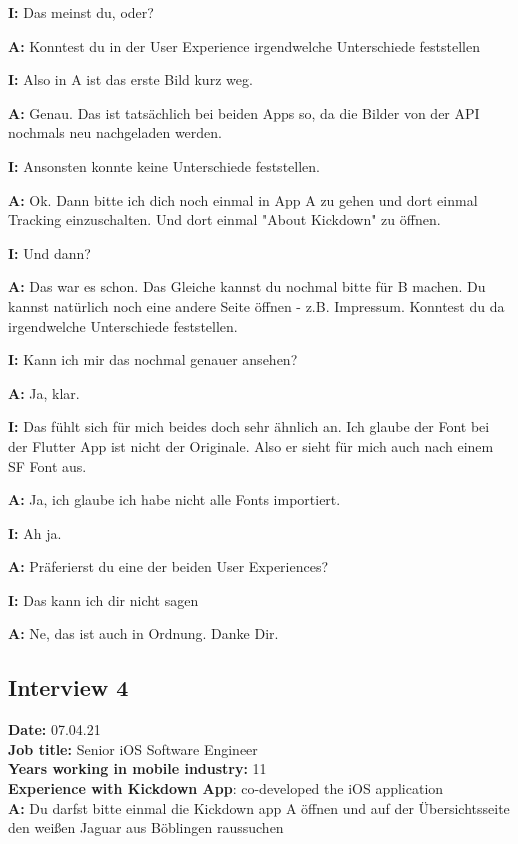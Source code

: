 \begin{myparindent}{0pt}
\textbf{I:} Das meinst du, oder?

\textbf{A:} Konntest du in der User Experience irgendwelche Unterschiede feststellen

\textbf{I:} Also in A ist das erste Bild kurz weg. 

\textbf{A:} Genau. Das ist tatsächlich bei beiden Apps so, da die Bilder von der API nochmals neu nachgeladen werden.

\textbf{I:} Ansonsten konnte keine Unterschiede feststellen.

\textbf{A:} Ok. Dann bitte ich dich noch einmal in App A zu gehen und dort einmal Tracking einzuschalten. Und dort einmal "About Kickdown" zu öffnen. 

\textbf{I:} Und dann?

\textbf{A:} Das war es schon. Das Gleiche kannst du nochmal bitte für B machen. Du kannst natürlich noch eine andere Seite öffnen - z.B. Impressum.
Konntest du da irgendwelche Unterschiede feststellen.

\textbf{I:} Kann ich mir das nochmal genauer ansehen?

\textbf{A:} Ja, klar.

\textbf{I:} Das fühlt sich für mich beides doch sehr ähnlich an. Ich glaube der Font bei der Flutter App ist nicht der Originale. Also er sieht für mich auch nach einem SF Font aus.

\textbf{A:} Ja, ich glaube ich habe nicht alle Fonts importiert.

\textbf{I:} Ah ja. 

\textbf{A:} Präferierst du eine der beiden User Experiences?

\textbf{I:} Das kann ich dir nicht sagen

\textbf{A:} Ne, das ist auch in Ordnung. Danke Dir.

\subsection{Interview 4}
\textbf{Date:} 07.04.21\\
\textbf{Job title:} Senior iOS Software Engineer\\
\textbf{Years working in mobile industry:} 11\\
\textbf{Experience with Kickdown App}: co-developed the iOS application\\


\textbf{A:} Du darfst bitte einmal die Kickdown app A öffnen und auf der Übersichtsseite den weißen Jaguar aus Böblingen raussuchen


\end{myparindent}
